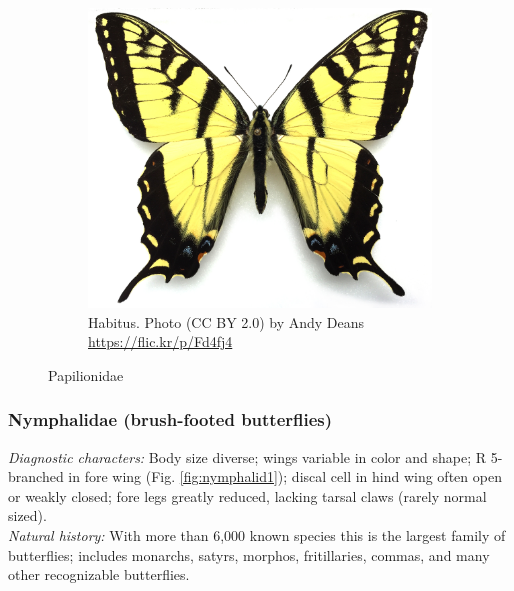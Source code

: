 \documentclass[letterpaper, 11pt]{article}
\begin{document}
\begin{figure}[ht!]
\begin{subfigure}[ht!]{0.5\textwidth}
        \includegraphics[width=\textwidth]{PapilionidHabitus}
        \caption{Habitus. Photo (CC BY 2.0) by Andy Deans \url{https://flic.kr/p/Fd4fj4}}
        \label{fig:papilionid2}
    \end{subfigure}
    \caption{Papilionidae}\label{fig:papilionids}
\end{figure}

\subsubsection{Nymphalidae (brush-footed butterflies)}
\noindent{}\textit{Diagnostic characters:} Body size diverse; wings variable in color and shape; R 5-branched in fore wing (Fig. \ref{fig:nymphalid1}); discal cell in hind wing often open or weakly closed; fore legs greatly reduced, lacking tarsal claws (rarely normal sized).\\

\noindent{}\textit{Natural history:} With more than 6,000 known species this is the largest family of butterflies; includes monarchs, satyrs, morphos, fritillaries, commas, and many other recognizable butterflies.
\end{document}
